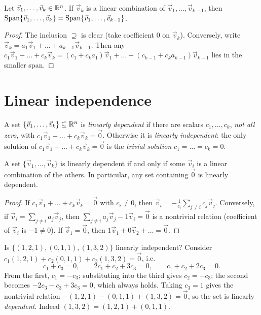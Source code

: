 \begin{theorem}\label{thm:span-reduce}
Let $\vec v_1,\dots,\vec v_k\in\mathbb{R}^n$. If $\vec v_k$ is a linear combination of
$\vec v_1,\dots,\vec v_{k-1}$, then
$\operatorname{Span}\{\vec v_1,\dots,\vec v_k\} = \operatorname{Span}\{\vec v_1,\dots,\vec v_{k-1}\}$.
\end{theorem}
\begin{proof}
The inclusion $\supseteq$ is clear (take coefficient $0$ on $\vec v_k$). Conversely, write
$\vec v_k = a_1\vec v_1+\dots+a_{k-1}\vec v_{k-1}$. Then any
$c_1\vec v_1+\dots+c_k\vec v_k = (c_1+c_ka_1)\vec v_1+\dots+(c_{k-1}+c_ka_{k-1})\vec v_{k-1}$
lies in the smaller span.
\end{proof}

\section{Linear independence}

\begin{definition}
A set $\{\vec v_1,\dots,\vec v_k\}\subseteq\mathbb{R}^n$ is \emph{linearly dependent} if there are
scalars $c_1,\dots,c_k$, \emph{not all zero}, with $c_1\vec v_1+\dots+c_k\vec v_k=\vec 0$.
Otherwise it is \emph{linearly independent}: the only solution of
$c_1\vec v_1+\dots+c_k\vec v_k=\vec 0$ is the \emph{trivial solution} $c_1=\dots=c_k=0$.
\end{definition}

\begin{theorem}
A set $\{\vec v_1,\dots,\vec v_k\}$ is linearly dependent if and only if some $\vec v_i$ is a
linear combination of the others. In particular, any set containing $\vec 0$ is linearly
dependent.
\end{theorem}
\begin{proof}
If $c_1\vec v_1+\dots+c_k\vec v_k=\vec 0$ with $c_i\ne0$, then
$\vec v_i = -\frac{1}{c_i}\sum_{j\ne i}c_j\vec v_j$. Conversely, if
$\vec v_i=\sum_{j\ne i}a_j\vec v_j$, then $\sum_{j\ne i}a_j\vec v_j - 1\vec v_i=\vec 0$ is a
nontrivial relation (coefficient of $\vec v_i$ is $-1\neq 0$). If $\vec v_1=\vec 0$, then
$1\vec v_1 + 0\vec v_2+\dots=\vec 0$.
\end{proof}

\begin{example}
Is $\{(1,2,1),(0,1,1),(1,3,2)\}$ linearly independent? Consider
$c_1(1,2,1)+c_2(0,1,1)+c_3(1,3,2)=\vec 0$, i.e.
\[
  c_1+c_3=0,\qquad 2c_1+c_2+3c_3=0,\qquad c_1+c_2+2c_3=0.
\]
From the first, $c_1=-c_3$; substituting into the third gives $c_2=-c_3$; the second
becomes $-2c_3-c_3+3c_3=0$, which always holds. Taking $c_3=1$ gives the nontrivial
relation $-(1,2,1)-(0,1,1)+(1,3,2)=\vec 0$, so the set is linearly \emph{dependent}. Indeed
$(1,3,2)=(1,2,1)+(0,1,1)$.
\end{example}

